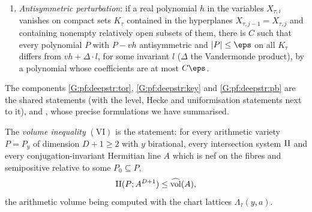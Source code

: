 \begin{definition}
\begin{enumerate}[label=(G\arabic*)]
dimension statement, the true proposition, a push-down statement and a Grassmannian height bound.
\item\label{G:pf:deepstr:anti} \emph{Antisymmetric perturbation}: if a real polynomial $h$ in the variables
$X_{\tau,i}$ vanishes on compact sets $K_\tau$ contained in the hyperplanes $X_{\tau,j-1}=X_{\tau,j}$ and
containing nonempty relatively open subsets of them, there is $C$ such that every polynomial $P$ with
$P-vh$ antisymmetric and $|P|\le\eps$ on all $K_\tau$ differs from $vh+\Delta\cdot l$, for some invariant
$l$ ($\Delta$ the Vandermonde product), by a polynomial whose coefficients are at most $C\eps$.
\end{enumerate}
\end{definition}

The components \ref{G:pf:deepstr:tor}, \ref{G:pf:deepstr:key} and \ref{G:pf:deepstr:pb} are the shared
statements  (with the level, Hecke and
uniformisation statements next to it), 
and , whose precise formulations we have summarised.

\begin{definition}\label{def:pf:deepstr:bppf}
The \emph{volume inequality} $\mathrm{(VI)}$ is the statement: for every arithmetic variety $P=P_y$ of
dimension $D+1\ge2$ with $y$ birational, every intersection system $\mathrm{II}$ and every conjugation-invariant
Hermitian line $A$ which is nef on the fibres and semipositive relative to some $P_0\subseteq P$,
\[
\mathrm{II}(P;A^{D+1})\le\widehat{\operatorname{vol}}(A),
\]
the arithmetic volume being computed with the chart lattices $\Lambda_\tau(y,a)$.
\end{definition}

